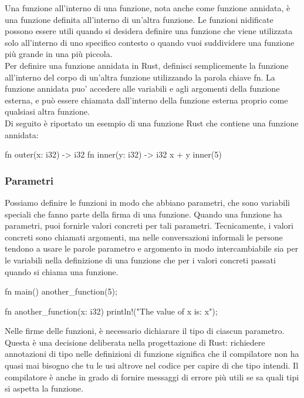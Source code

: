 \documentclass[11pt,a4paper]{article}
\begin{document}
Una funzione all'interno di una funzione, nota anche come funzione annidata, è una funzione definita all'interno di un'altra funzione. Le funzioni nidificate possono essere utili quando si desidera definire una funzione che viene utilizzata solo all'interno di uno specifico contesto o quando vuoi suddividere una funzione più grande in una più piccola.\\
Per definire una funzione annidata in Rust, definisci semplicemente la funzione all'interno del corpo di un'altra funzione utilizzando la parola chiave fn. La funzione annidata puo' accedere alle variabili e agli argomenti della funzione esterna, e può essere chiamata dall'interno della funzione esterna proprio come qualsiasi altra funzione.\\
Di seguito è riportato un esempio di una funzione Rust che contiene una funzione annidata:

\begin{rust}
fn outer(x: i32) -> i32 {
	fn inner(y: i32) -> i32 {
		x + y
	}
	inner(5)
}
\end{rust}

\subsubsection{Parametri}
Possiamo definire le funzioni in modo che abbiano parametri, che sono variabili speciali che fanno parte della firma di una funzione. Quando una funzione ha parametri, puoi fornirle valori concreti per tali parametri. Tecnicamente, i valori concreti sono chiamati argomenti, ma nelle conversazioni informali le persone tendono a usare le parole parametro e argomento in modo intercambiabile sia per le variabili nella definizione di una funzione che per i valori concreti passati quando si chiama una funzione.

\begin{rust}
fn main() {
    another_function(5);
}

fn another_function(x: i32) {
    println!("The value of x is: {x}");
}
\end{rust}

Nelle firme delle funzioni, è necessario dichiarare il tipo di ciascun parametro. Questa è una decisione deliberata nella progettazione di Rust: richiedere annotazioni di tipo nelle definizioni di funzione significa che il compilatore non ha quasi mai bisogno che tu le usi altrove nel codice per capire di che tipo intendi. Il compilatore è anche in grado di fornire messaggi di errore più utili se sa quali tipi si aspetta la funzione.
\end{document}
